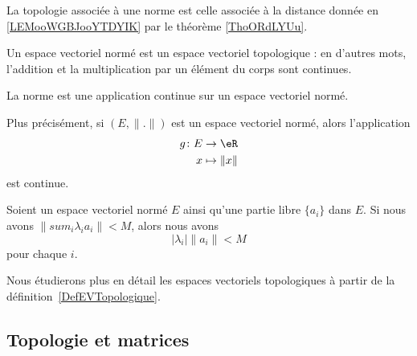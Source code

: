 \begin{definition}      \label{DEFooPMVFooPSYVNQ}
    La topologie associée à une norme est celle associée à la distance donnée en \ref{LEMooWGBJooYTDYIK} par le théorème \ref{ThoORdLYUu}.
\end{definition}

\begin{corollary}       \label{CORooMWCUooKyoyZV}
    Un espace vectoriel normé est un espace vectoriel topologique : en d'autres mots, l'addition et la multiplication par un élément du corps sont continues.
\end{corollary}

\begin{proposition}     \label{PROPooYMCUooERvDpk}
    La norme est une application continue sur un espace vectoriel normé.

    Plus précisément, si \( (E,\| . \|)\) est un espace vectoriel normé, alors l'application
    \begin{equation}
        \begin{aligned}
            g\colon E&\to \eR \\
            x&\mapsto \| x \| 
        \end{aligned}
    \end{equation}
    est continue.
\end{proposition}

\begin{lemma}        \label{LEMooGCJEooOAynZW}
    Soient un espace vectoriel normé \( E\) ainsi qu'une partie libre \( \{ a_i \}\) dans \( E\). Si nous avons \( \| sum_i\lambda_ia_i \|<M\), alors nous avons
    \begin{equation}
        | \lambda_i |\| a_i \|<M
    \end{equation}
    pour chaque \( i\).
\end{lemma}


Nous étudierons plus en détail les espaces vectoriels topologiques à partir de la définition~\ref{DefEVTopologique}.

\subsection{Topologie et matrices}

